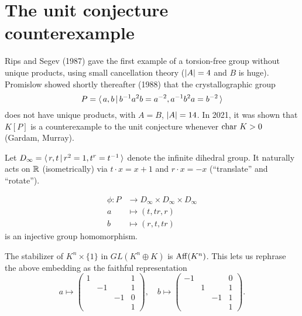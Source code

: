 \section{The unit conjecture counterexample}

Rips and Segev (1987) gave the first example of a torsion-free group without unique products, using small cancellation theory ($\lvert A \rvert = 4$ and $B$ is huge).
Promislow showed shortly thereafter (1988) that the crystallographic group \[
    P = \langle \, a, b \, | \, b^{-1} a^2 b = a^{-2}, a^{-1} b^2 a = b^{-2} \, \rangle
\]
does not have unique products, with $A = B$, $\lvert A \rvert = 14$.
In 2021, it was shown that $K[P]$ is a counterexample to the unit conjecture whenever $\mathrm{char}\ K > 0$ (Gardam, Murray).

Let $D_\infty = \langle \, r, t \, | \, r^2 = 1, t^r = t^{-1} \, \rangle$ denote the infinite dihedral group.
It naturally acts on $\mathbb{R}$ (isometrically) via $t \cdot x = x+1$ and $r \cdot x = -x$ (``translate'' and ``rotate'').

\begin{lemma}
    \label{lemma:promislow_embedding}
    \begin{align*}
        \phi \colon P &\to D_\infty \times D_\infty \times D_\infty \\
        a &\mapsto (t, tr, r) \\
        b &\mapsto (r, t, tr)
    \end{align*}
    is an injective group homomorphism.
\end{lemma}

\begin{remark}
    The stabilizer of $K^n \times \{1\}$ in $GL(K^n \oplus K)$ is $\mathrm{Aff}(K^n)$.
    This lets us rephrase the above embedding as the faithful representation \[
        a \mapsto \begin{pmatrix}
            1 &    &    & 1 \\
              & -1 &    & 1 \\
              &    & -1 & 0 \\
              &    &    & 1
        \end{pmatrix},
        \quad
        b \mapsto \begin{pmatrix}
            -1 &   &    & 0 \\
               & 1 &    & 1 \\
               &   & -1 & 1 \\
               &   &    & 1
        \end{pmatrix}.
     \]
\end{remark}

